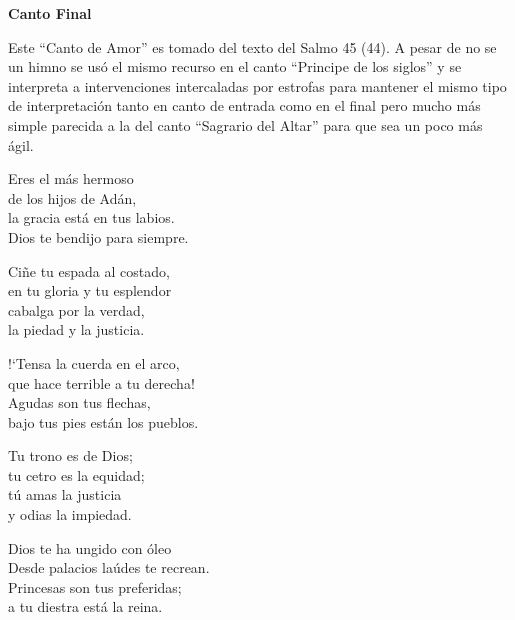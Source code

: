 \documentclass[12pt, letterpaper]{report}
\begin{document}


    \begin{center}
        \Huge {\bfseries Canto Final}
    \end{center}

    \Large Este ``Canto de Amor'' es tomado del texto del Salmo 45 (44). A pesar de no se un himno se us\'o el mismo recurso en el canto ``Principe de los siglos'' y se interpreta a intervenciones intercaladas por estrofas para mantener el mismo tipo de interpretaci\'on tanto en canto de entrada como en el final pero mucho m\'as simple parecida a la del canto ``Sagrario del Altar'' para que sea un poco m\'as \'agil.

    \noindent
    \LARGE Eres el m\'as hermoso\\
    de los hijos de Ad\'an,\\
    la gracia est\'a en tus labios.\\
    Dios te bendijo para siempre.

    \noindent
    Ci\~ne tu espada al costado,\\
    en tu gloria y tu esplendor\\
    cabalga por la verdad,\\
    la piedad y la justicia.

    \noindent
    !`Tensa la cuerda en el arco,\\
    que hace terrible a tu derecha!\\
    Agudas son tus flechas,\\
    bajo tus pies est\'an los pueblos.

    \noindent
    Tu trono es de Dios;\\
    tu cetro es la equidad;\\
    t\'u amas la justicia\\
    y odias la impiedad.

    \noindent
    Dios te ha ungido con \'oleo\\
    Desde palacios la\'udes te recrean.\\
    Princesas son tus preferidas;\\
    a tu diestra est\'a la reina.
\end{document}
